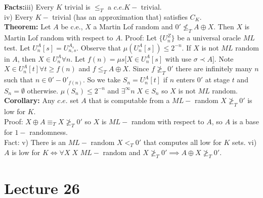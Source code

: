 \documentclass{article}
\begin{document}
  \textbf{Facts:}iii) Every $K$ trivial is $\leq_T$ a $c.e. K-$ trivial. \\
  iv) Every $K-$ trivial (has an approximation that) satisfies $C_K$. \\
  \textbf{Theorem:} Let $A$ be c.e., $X$ a Martin Lof random and $0' \not \leq_T A \oplus X$. Then $X$ is Martin Lof random with respect to $A$.
   Proof: Let $\{U_n^Z\}$ be a universal oracle $ML$ test. Let $U_n^A[s] = U_{n,s}^{A_s}$. Observe that $\mu(U_n^A[s]) \leq 2^{-n}$. If $X$ is not $ML$ random in $A$, then $X \in U_n^A \forall n$. Let $f(n) = \mu s [X \in U_n^A[s]$ with use $\sigma \prec A]$. Note $X \in U_n^A[t] \forall t \geq f(n)$ and $f \leq_TA\oplus X$. Since $f \not \geq_T0'$ there are infinitely many $n$ such that $n \in 0' - 0'_{f(n)}$. So we take $S_n = U_n^A[t]$ if $n$ enters $0'$ at stage $t$ and $S_n = \emptyset$ otherwise. $\mu(S_n) \leq 2^{-n}$ and $\exists^\infty n \; X \in S_n$ so $X$ is not $ML$ random.\\
   \textbf{Corollary:} Any $c.e.$ set $A$ that is computable from a $ML-$ random $X \not \geq_T 0'$ is low for $K$.\\
   Proof: $X \oplus A \equiv_T X \not \geq_T 0' $ so $X$ is $ML-$ random with respect to $A$, so $A$ is a base for $1-$ randomness.\\
   Fact: v) There is an $ML-$ random $X <_T 0'$ that computes all low for $K$ sets.
   vi) $A$ is low for $K \iff \forall X\; X$ $ML-$ random and $X \not \geq_T 0' \implies A \oplus X \not \geq_T 0'$. 
   \newpage
   \section{Lecture 26}
  
  
    
\end{document}

